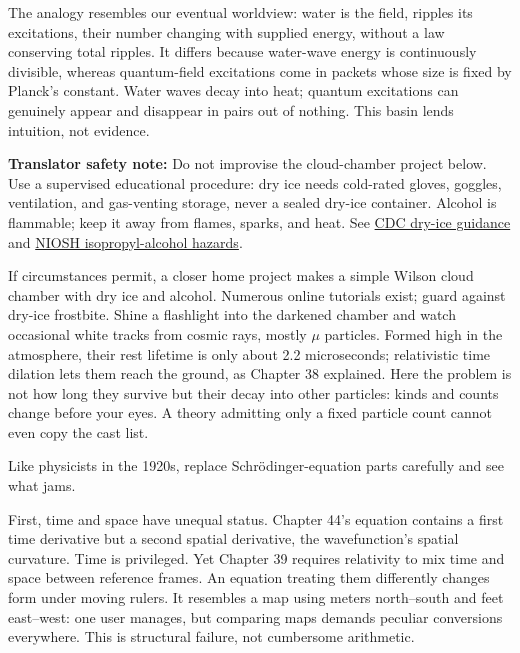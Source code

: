 The analogy resembles our eventual worldview: water is the field, ripples its excitations, their number changing with supplied energy, without a law conserving total ripples. It differs because water-wave energy is continuously divisible, whereas quantum-field excitations come in packets whose size is fixed by Planck's constant. Water waves decay into heat; quantum excitations can genuinely appear and disappear in pairs out of nothing. This basin lends intuition, not evidence.

\textbf{Translator safety note:} Do not improvise the cloud-chamber project below. Use a supervised educational procedure: dry ice needs cold-rated gloves, goggles, ventilation, and gas-venting storage, never a sealed dry-ice container. Alcohol is flammable; keep it away from flames, sparks, and heat. See \href{https://stacks.cdc.gov/view/cdc/103603/cdc_103603_DS1.pdf}{CDC dry-ice guidance} and \href{https://www.cdc.gov/niosh/npg/npgd0359.html}{NIOSH isopropyl-alcohol hazards}.

If circumstances permit, a closer home project makes a simple Wilson cloud chamber with dry ice and alcohol. Numerous online tutorials exist; guard against dry-ice frostbite. Shine a flashlight into the darkened chamber and watch occasional white tracks from cosmic rays, mostly \(\mu\) particles. Formed high in the atmosphere, their rest lifetime is only about 2.2 microseconds; relativistic time dilation lets them reach the ground, as Chapter 38 explained. Here the problem is not how long they survive but their decay into other particles: kinds and counts change before your eyes. A theory admitting only a fixed particle count cannot even copy the cast list.


Like physicists in the 1920s, replace Schrödinger-equation parts carefully and see what jams.

First, time and space have unequal status. Chapter 44's equation contains a first time derivative but a second spatial derivative, the wavefunction's spatial curvature. Time is privileged. Yet Chapter 39 requires relativity to mix time and space between reference frames. An equation treating them differently changes form under moving rulers. It resembles a map using meters north--south and feet east--west: one user manages, but comparing maps demands peculiar conversions everywhere. This is structural failure, not cumbersome arithmetic.

